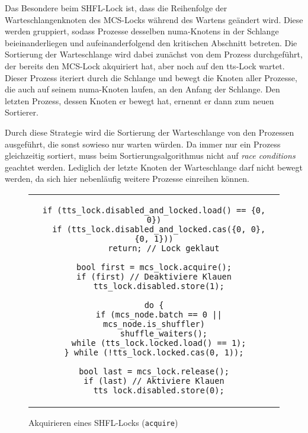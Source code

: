 Das Besondere beim SHFL-Lock ist,
dass die Reihenfolge der Warteschlangenknoten des MCS-Locks
während des Wartens
geändert wird.
Diese werden gruppiert,
sodass Prozesse desselben \gls{numa}-Knotens in der Schlange beieinanderliegen
und aufeinanderfolgend den kritischen Abschnitt betreten.
Die Sortierung der Warteschlange wird dabei zunächst von dem Prozess durchgeführt,
der bereits den MCS-Lock akquiriert hat,
aber noch auf den \gls{tts}-Lock wartet.
Dieser Prozess iteriert durch die Schlange
und bewegt die Knoten aller Prozesse,
die auch auf seinem \gls{numa}-Knoten laufen,
an den Anfang der Schlange.
Den letzten Prozess,
dessen Knoten er bewegt hat,
ernennt er dann zum neuen Sortierer.

Durch diese Strategie wird die Sortierung der Warteschlange von den Prozessen ausgeführt,
die sonst sowieso nur warten würden.
Da immer nur ein Prozess gleichzeitig sortiert,
muss beim Sortierungsalgorithmus nicht auf \textit{race conditions} geachtet werden.
Lediglich der letzte Knoten der Warteschlange darf nicht bewegt werden,
da sich hier nebenläufig weitere Prozesse einreihen können.

\begin{figure}[h]
    \centering
    \begin{tabular}{c}\begin{lstlisting}
if (tts_lock.disabled_and_locked.load() == {0, 0})
  if (tts_lock.disabled_and_locked.cas({0, 0}, {0, 1}))
    return; // Lock geklaut

bool first = mcs_lock.acquire();
if (first) // Deaktiviere Klauen
  tts_lock.disabled.store(1);

do {
  if (mcs_node.batch == 0 || mcs_node.is_shuffler)
    shuffle_waiters();
  while (tts_lock.locked.load() == 1);
} while (!tts_lock.locked.cas(0, 1));

bool last = mcs_lock.release();
if (last) // Aktiviere Klauen
  tts_lock.disabled.store(0);
    \end{lstlisting}\end{tabular}
    \caption{Akquirieren eines SHFL-Locks (\texttt{acquire})}
    \label{fig:shfl_acquire}
\end{figure}

